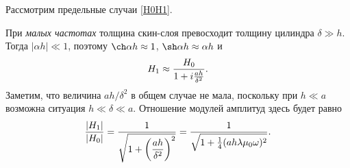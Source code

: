 %
%


Рассмотрим предельные случаи \eqref{H0H1}.

При \emph{малых частотах} толщина скин-слоя превосходит толщину цилиндра
$\delta \gg h$. Тогда $|\alpha h| \ll 1$,
поэтому $\ch \alpha h \approx 1$, $\sh \alpha h\approx \alpha h$ и
\begin{equation}\eqmark{H1}
H_1 \approx \frac{H_0}{1 + i \frac{a h}{\delta ^2}}.
\end{equation}
Заметим, что величина $ah/\delta^2$ в общем случае не мала, поскольку
при $h\ll a$ возможна ситуация $h\ll \delta \ll a$.
Отношение модулей амплитуд здесь будет равно
\begin{equation} \eqmark{27}
\frac{|H_1|}{|H_0|} = \frac{1}{\sqrt{1+\left(\dfrac{ah}{\delta^2}\right)^2}} =
\frac{1}{\sqrt{1+\frac14 (ah \lambda \mu_0 \omega)^2}}.
\end{equation}

